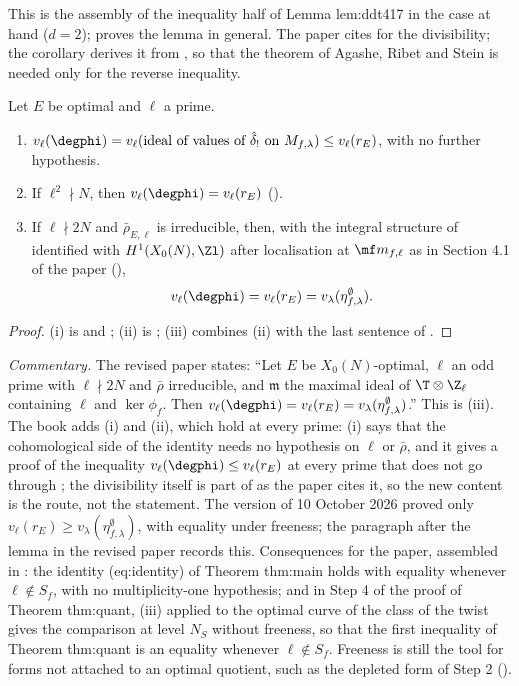 This is the assembly of the inequality half of Lemma lem:ddt417 in the case at hand ($d=2$);  proves the lemma in general. The paper cites \cite{ARS12} for the
divisibility; the corollary derives it from , so that the theorem of Agashe, Ribet and Stein is needed only for the reverse inequality.

\begin{theorem}\label{thm:moddeg:lem-hecke}
Let $E$ be optimal and $\ell$ a prime.
\begin{enumerate}[label=(\roman*)]
\item $v_\ell(\degphi)=v_\ell(\text{ideal of values of }\hat\delta_!\text{ on }M_{f,\lambda})\le v_\ell(r_E)$, with no further hypothesis.
\item If $\ell^2\nmid N$, then $v_\ell(\degphi)=v_\ell(r_E)$ ().
\item If $\ell\nmid2N$ and $\bar\rho_{E,\ell}$ is irreducible, then, with the integral structure of \cite{DFG04} identified with $H^1(X_0(N),\Zl)$ after localisation at $\mf m_{f,\ell}$ as in Section 4.1
of the paper (),
\[
v_\ell(\degphi)=v_\ell(r_E)=v_\lambda(\eta^\emptyset_{f,\lambda}).
\]
\end{enumerate}
\end{theorem}

\begin{proof}
(i) is  and ; (ii) is ; (iii) combines (ii) with the last sentence of .
\end{proof}

\noindent\emph{Commentary.} The revised paper states: ``Let $E$ be $X_0(N)$-optimal, $\ell$ an odd prime with $\ell\nmid 2N$ and $\bar\rho$ irreducible, and $\mathfrak m$ the maximal ideal of
$\T\otimes\Z_\ell$ containing $\ell$ and $\ker\phi_f$. Then $v_\ell(\degphi)=v_\ell(r_E)=v_\lambda(\eta^\emptyset_{f,\lambda})$.'' This is (iii). The book adds (i) and (ii), which hold at every prime: (i) says that the
cohomological side of the identity needs no hypothesis on $\ell$ or $\bar\rho$, and it gives a proof of the inequality $v_\ell(\degphi)\le v_\ell(r_E)$ at every prime that does not go
through \cite{ARS12}; the divisibility itself is part of \cite[Theorem 2.2]{ARS12} as the paper cites it, so the new content is the route, not the statement. The version of 10 October 2026 proved only $v_\ell(r_E)\ge v_\lambda(\eta^\emptyset_{f,\lambda})$, with
equality under freeness; the paragraph after the lemma in the revised paper records this. Consequences for the paper, assembled in : the identity (eq:identity) of
Theorem thm:main holds with equality whenever $\ell\notin S_f$, with no multiplicity-one hypothesis; and in Step 4 of the proof of Theorem thm:quant, (iii) applied to the optimal curve
of the class of the twist gives the comparison at level $N_S$ without freeness, so that the first inequality of Theorem thm:quant is an equality whenever $\ell\notin S_f$. Freeness is still
the tool for forms not attached to an optimal quotient, such as the depleted form of Step 2 ().

